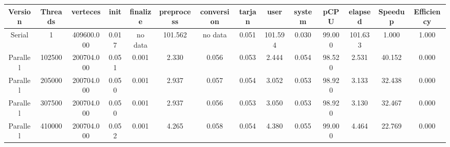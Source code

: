 \begin{tabular}{|c|c|c|c|c|c|c|c|c|c|c|c|c|c|}
\toprule
 Version &  Threads &   verteces &  init & finalize &  preprocess & conversion &  tarjan &    user &  system &   pCPU &  elapsed &  Speedup &  Efficiency \\
\midrule
  Serial &        1 & 409600.000 & 0.017 &  no data &     101.562 &    no data &   0.051 & 101.594 &   0.030 & 99.000 &  101.633 &    1.000 &       1.000 \\
Parallel &   102500 & 200704.000 & 0.051 &    0.001 &       2.330 &      0.056 &   0.053 &   2.444 &   0.054 & 98.520 &    2.531 &   40.152 &       0.000 \\
Parallel &   205000 & 200704.000 & 0.050 &    0.001 &       2.937 &      0.057 &   0.054 &   3.052 &   0.053 & 98.920 &    3.133 &   32.438 &       0.000 \\
Parallel &   307500 & 200704.000 & 0.050 &    0.001 &       2.937 &      0.056 &   0.053 &   3.050 &   0.053 & 98.920 &    3.130 &   32.467 &       0.000 \\
Parallel &   410000 & 200704.000 & 0.052 &    0.001 &       4.265 &      0.058 &   0.054 &   4.380 &   0.055 & 99.000 &    4.464 &   22.769 &       0.000 \\
\bottomrule
\end{tabular}

